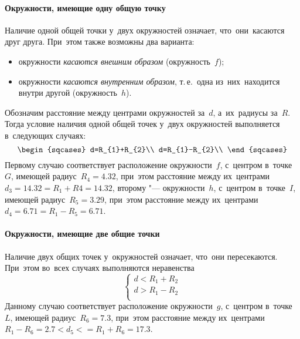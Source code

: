 \documentclass[]{scrartcl}
\begin{document}
\paragraph{Окружности, имеющие одну общую точку}
Наличие одной общей точки у~двух окружностей означает, что~они~касаются друг друга. При~этом также возможны два варианта:
\begin{itemize}
	\item окружности \emph{касаются внешним образом} (окружность~${\textstyle f}$);
	\item окружности \emph{касаются внутренним образом}, т.\,е.~одна из~них~находится внутри другой (окружность~${\textstyle h}$).
\end{itemize}
Обозначим расстояние между центрами окружностей за~${\textstyle d}$, а~их~радиусы за~${\textstyle R}$. Тогда условие наличия одной общей точек у~двух окружностей выполняется в~следующих случаях:
\begin{equation}\label{eq:two-circles-intersect-one-point}
\begin{sqcases}
d=R_{1}+R_{2}\\
d=R_{1}-R_{2}\\
\end{sqcases}
\end{equation}
Первому случаю соответствует расположение окружности~${\textstyle f}$, с~центром в~точке~${\textstyle G}$, имеющей радиус~${\textstyle R_{4}=4.32}$, при~этом расстояние между их~центрами~${\textstyle d_{3}=14.32=R_{1}+R{4}=14.32}$, второму "--- окружности~${\textstyle h}$, с~центром в~точке~${\textstyle I}$, имеющей радиус~${\textstyle R_{5}=3.29}$, при~этом расстояние между их~центрами~${\textstyle d_{4}=6.71=R_{1}-R_{5}=6.71}$.
\paragraph{Окружности, имеющие две общие точки}
Наличие двух общих точек у~окружностей означает, что~они пересекаются. При~этом во~всех случаях выполняются неравенства
\begin{equation}\label{eq:two-circles-intersect-two-points}
\begin{cases}
d<R_{1}+R_{2}\\
d>R_{1}-R_{2}\\
\end{cases}
\end{equation}
Данному случаю соответствует расположение окружности~${\textstyle g}$, с~центром в~точке~${\textstyle L}$, имеющей радиус~${\textstyle R_{6}=7.3}$, при~этом расстояние между их~центрами~${\textstyle R_{1}-R_{6}=2.7<d_{5}<=R_{1}+R_{6}=17.3}$.
\end{document}
